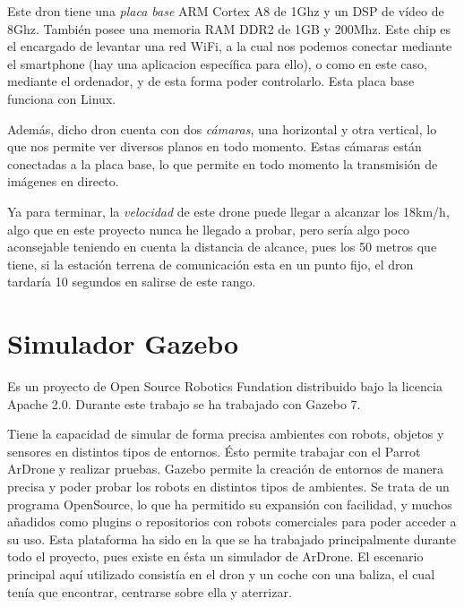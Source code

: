 \hspace{1 cm} Este dron tiene una \textsl{placa base} ARM Cortex A8 de 1Ghz y un DSP de v\'ideo de 8Ghz. Tambi\'en posee una memoria RAM DDR2 de 1GB y 200Mhz. Este chip es el encargado de levantar una red WiFi, a la cual nos podemos conectar mediante el smartphone (hay una aplicacion espec\'ifica para ello), o como en este caso, mediante el ordenador, y de esta forma poder controlarlo. Esta placa base funciona con Linux. 

\hspace{1 cm} Adem\'as, dicho dron cuenta con dos \textsl{c\'amaras}, una horizontal y otra vertical, lo que nos permite ver diversos planos en todo momento. Estas c\'amaras est\'an conectadas a la placa base, lo que permite en todo momento la transmisi\'on de im\'agenes en directo.


\hspace{1 cm} Ya para terminar, la \textsl{velocidad} de este drone puede llegar a alcanzar los 18km/h, algo que en este proyecto nunca he llegado a probar, pero ser\'ia algo poco aconsejable teniendo en cuenta la distancia de alcance, pues los 50 metros que tiene, si la estaci\'on terrena de comunicaci\'on esta en un punto fijo, el dron tardar\'ia 10 segundos en salirse de este rango. 


\section{Simulador Gazebo }
\hspace{1 cm} Es un proyecto de Open Source Robotics Fundation distribuido bajo la licencia Apache 2.0. Durante este trabajo se ha trabajado con Gazebo 7. 

\hspace{1 cm}Tiene la capacidad de simular de forma precisa ambientes con robots, objetos y sensores en distintos tipos de entornos. \'Esto permite trabajar con el Parrot ArDrone y realizar pruebas. Gazebo permite la creaci\'on de entornos de manera precisa y poder probar los robots en distintos tipos de ambientes. Se trata de un programa OpenSource, lo que ha permitido su expansi\'on con facilidad, y muchos añadidos como plugins o repositorios con robots comerciales para poder acceder a su uso. Esta plataforma ha sido en la que se ha trabajado principalmente durante todo el proyecto, pues existe en \'esta un simulador de ArDrone. El escenario principal aqu\'i utilizado consist\'ia en el dron y un coche con una baliza, el cual ten\'ia que encontrar, centrarse sobre ella y aterrizar.

